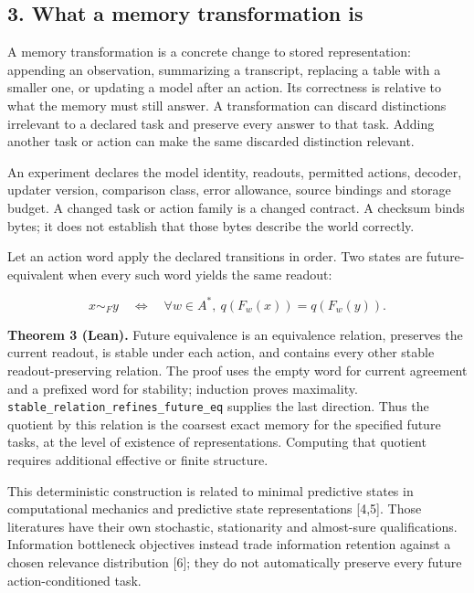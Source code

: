 \documentclass[
  10pt,
]{article}
\begin{document}
\subsection{3. What a memory transformation is}\label{what-a-memory-transformation-is}

A memory transformation is a concrete change to stored representation: appending an observation, summarizing a transcript, replacing a table with a smaller one, or updating a model after an action. Its correctness is relative to what the memory must still answer. A transformation can discard distinctions irrelevant to a declared task and preserve every answer to that task. Adding another task or action can make the same discarded distinction relevant.

An experiment declares the model identity, readouts, permitted actions, decoder, updater version, comparison class, error allowance, source bindings and storage budget. A changed task or action family is a changed contract. A checksum binds bytes; it does not establish that those bytes describe the world correctly.

Let an action word apply the declared transitions in order. Two states are future-equivalent when every such word yields the same readout:

\protect\hypertarget{math-E0005-0005}{}{\[
x\sim_F y\quad\Longleftrightarrow\quad
\forall w\in A^*,\ q(F_w(x))=q(F_w(y)).
\]}

\textbf{Theorem 3 (Lean).} Future equivalence is an equivalence relation, preserves the current readout, is stable under each action, and contains every other stable readout-preserving relation. The proof uses the empty word for current agreement and a prefixed word for stability; induction proves maximality. \texttt{stable\_relation\_refines\_future\_eq} supplies the last direction. Thus the quotient by this relation is the coarsest exact memory for the specified future tasks, at the level of existence of representations. Computing that quotient requires additional effective or finite structure.

This deterministic construction is related to minimal predictive states in computational mechanics and predictive state representations {[}4,5{]}. Those literatures have their own stochastic, stationarity and almost-sure qualifications. Information bottleneck objectives instead trade information retention against a chosen relevance distribution {[}6{]}; they do not automatically preserve every future action-conditioned task.
\end{document}
